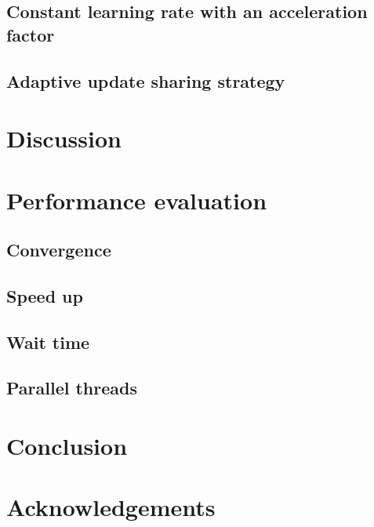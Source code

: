 \documentclass[letterpaper]{article}
\begin{document}
\subsection{Constant learning rate with an acceleration factor}
\label{sect_acceleration_factor}







\subsection{Adaptive update sharing strategy}
\label{sect_update_sharing}




\section{Discussion}
\label{sect_discussion}









\section{Performance evaluation}
\label{sect_performance_evaluation}




\subsection{Convergence}
\label{sect_performance_evaluation_convergence}







\subsection{Speed up}
\label{sect_performance_evaluation_speed_up}







\subsection{Wait time}
\label{sect_performance_evaluation_wait_time}






\subsection{Parallel threads}
\label{sect_performance_evaluation_parallel_threads}





\section{Conclusion}
\label{sect_conclusion}








\section*{Acknowledgements}



\end{document}

